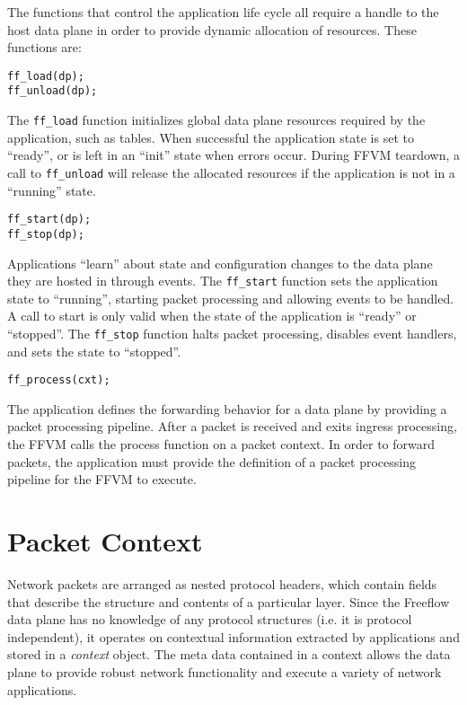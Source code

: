 The functions that control the application life cycle all require a handle
to the host data plane in order to provide dynamic allocation of resources.
These functions are:

\begin{lstlisting}
ff_load(dp);
ff_unload(dp);
\end{lstlisting}

The \texttt{ff\_load} function initializes global data plane resources required
by the application, such as tables. When successful the application state is
set to ``ready'', or is left in an ``init'' state when errors occur. During
FFVM teardown, a call to \texttt{ff\_unload} will release the allocated
resources if the application is not in a ``running'' state.

\begin{lstlisting}
ff_start(dp);
ff_stop(dp);
\end{lstlisting}

Applications ``learn'' about state and configuration changes to the data plane
they are hosted in through events. The \texttt{ff\_start} function sets the
application state to ``running'', starting packet processing and allowing events
to be handled. A call to start is only valid when the state of the application
is ``ready'' or ``stopped''. The \texttt{ff\_stop} function halts packet
processing, disables event handlers, and sets the state to ``stopped''.

\begin{lstlisting}
ff_process(cxt);
\end{lstlisting}

The application defines the forwarding behavior for a data plane by providing
a packet processing pipeline. After a packet is received and exits ingress
processing, the FFVM calls the process function on a packet context. In order
to forward packets, the application must provide the definition of a packet
processing pipeline for the FFVM to execute.

\section{Packet Context}
\label{vm:packet-context}
Network packets are arranged as nested protocol headers, which contain fields
that describe the structure and contents of a particular layer. Since the
Freeflow data plane has no knowledge of any protocol structures (i.e. it is
protocol independent), it operates on contextual information extracted by
applications and stored in a \emph{context} object. The meta data contained
in a context allows the data plane to provide robust network functionality
and execute a variety of network applications.

